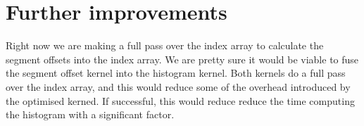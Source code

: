\documentclass[12pt, a4paper, hidelinks]{article}
\begin{document}
\section{Further improvements}
Right now we are making a full pass over the index array to calculate
the segment offsets into the index array.
We are pretty sure it would be viable to fuse the segment offset
kernel into the histogram kernel.
Both kernels do a full pass over the index array,
and this would reduce some of the overhead introduced
by the optimised kerned. If successful,
this would reduce reduce the time computing the histogram with a significant factor.


\end{document}
